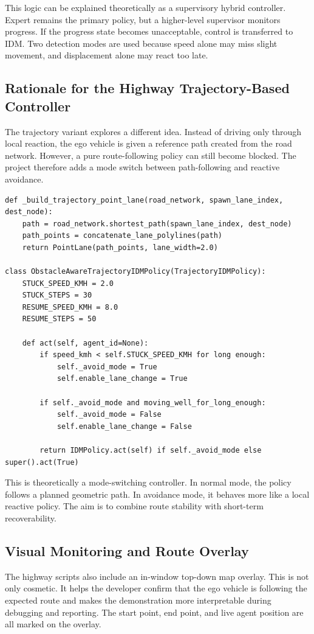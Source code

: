 \documentclass[12pt,a4paper]{report}
\begin{document}
This logic can be explained theoretically as a supervisory hybrid controller. Expert remains the primary policy, but a higher-level supervisor monitors progress. If the progress state becomes unacceptable, control is transferred to IDM. Two detection modes are used because speed alone may miss slight movement, and displacement alone may react too late.

\subsection{Rationale for the Highway Trajectory-Based Controller}
The trajectory variant explores a different idea. Instead of driving only through local reaction, the ego vehicle is given a reference path created from the road network. However, a pure route-following policy can still become blocked. The project therefore adds a mode switch between path-following and reactive avoidance.

\begin{lstlisting}[caption={Simplified logic of the highway trajectory variant.},label={lst:traj_logic},float=H]
def _build_trajectory_point_lane(road_network, spawn_lane_index, dest_node):
    path = road_network.shortest_path(spawn_lane_index, dest_node)
    path_points = concatenate_lane_polylines(path)
    return PointLane(path_points, lane_width=2.0)

class ObstacleAwareTrajectoryIDMPolicy(TrajectoryIDMPolicy):
    STUCK_SPEED_KMH = 2.0
    STUCK_STEPS = 30
    RESUME_SPEED_KMH = 8.0
    RESUME_STEPS = 50

    def act(self, agent_id=None):
        if speed_kmh < self.STUCK_SPEED_KMH for long enough:
            self._avoid_mode = True
            self.enable_lane_change = True

        if self._avoid_mode and moving_well_for_long_enough:
            self._avoid_mode = False
            self.enable_lane_change = False

        return IDMPolicy.act(self) if self._avoid_mode else super().act(True)
\end{lstlisting}

This is theoretically a mode-switching controller. In normal mode, the policy follows a planned geometric path. In avoidance mode, it behaves more like a local reactive policy. The aim is to combine route stability with short-term recoverability.

\subsection{Visual Monitoring and Route Overlay}
The highway scripts also include an in-window top-down map overlay. This is not only cosmetic. It helps the developer confirm that the ego vehicle is following the expected route and makes the demonstration more interpretable during debugging and reporting. The start point, end point, and live agent position are all marked on the overlay.
\end{document}
